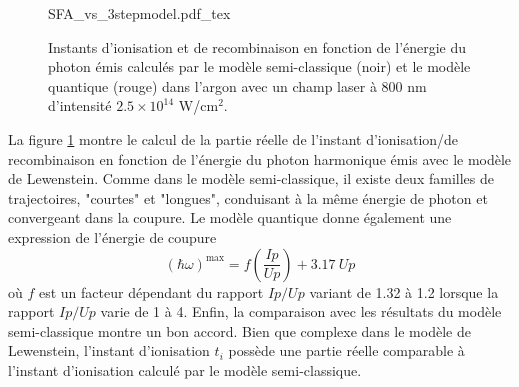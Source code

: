 \begin{figure}[ht]
\centering
\def\svgwidth{\columnwidth}
{SFA_vs_3stepmodel.pdf_tex}
\caption{Instants d'ionisation et de recombinaison en fonction de l'énergie du photon émis calculés par le modèle semi-classique (noir) et le modèle quantique (rouge) dans l'argon avec un champ laser à 800 nm d'intensité $2.5 \times 10^{14}$ W/cm$^2$.}
\label{fig:SFA_vs_3step}
\end{figure}

La figure \ref{fig:SFA_vs_3step} montre le calcul de la partie réelle de l'instant d'ionisation/de recombinaison en fonction de l'énergie du photon harmonique émis avec le modèle de Lewenstein. Comme dans le modèle semi-classique, il existe deux familles de trajectoires, "courtes" et "longues", conduisant à la même énergie de photon et convergeant dans la coupure. Le modèle quantique donne également une expression de l'énergie de coupure 
\begin{equation}
(\hbar \omega)^{\text{max}} = f(\frac{Ip}{Up}) + 3.17 \: Up
\end{equation}
où $f$ est un facteur dépendant du rapport $Ip/Up$ variant de 1.32 à 1.2 lorsque la rapport $Ip/Up$ varie de 1 à 4. Enfin, la comparaison avec les résultats du modèle semi-classique montre un bon accord. Bien que complexe dans le modèle de Lewenstein, l'instant d'ionisation $t_i$ possède une partie réelle comparable à l'instant d'ionisation calculé par le modèle semi-classique.

